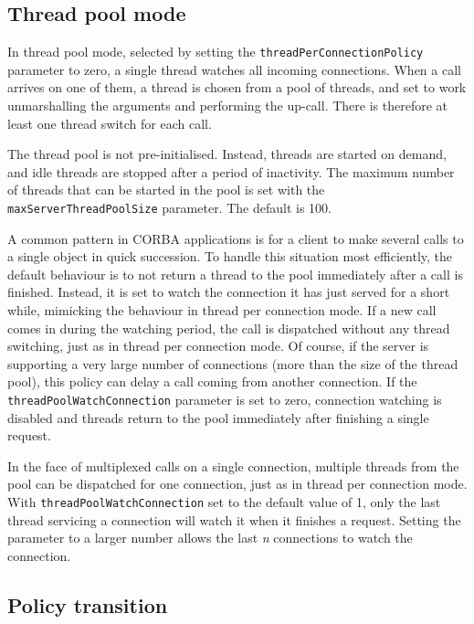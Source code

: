 \documentclass[11pt,oneside,a4paper]{book}
\newcommand{\code}[1]{\texttt{#1}}
\newcommand{\dsc}{\discretionary{}{}{}}
\begin{document}
\subsection{Thread pool mode}
\label{sec:watchConn}

In thread pool mode, selected by setting the
\code{threadPerConnectionPolicy} parameter to zero, a single thread
watches all incoming connections. When a call arrives on one of them,
a thread is chosen from a pool of threads, and set to work
unmarshalling the arguments and performing the up-call. There is
therefore at least one thread switch for each call.

The thread pool is not pre-initialised. Instead, threads are started
on demand, and idle threads are stopped after a period of inactivity.
The maximum number of threads that can be started in the pool is set
with the \code{maxServer\dsc{}ThreadPoolSize} parameter. The default
is 100.

A common pattern in CORBA applications is for a client to make several
calls to a single object in quick succession. To handle this situation
most efficiently, the default behaviour is to not return a thread to
the pool immediately after a call is finished. Instead, it is set to
watch the connection it has just served for a short while, mimicking
the behaviour in thread per connection mode. If a new call comes in
during the watching period, the call is dispatched without any thread
switching, just as in thread per connection mode. Of course, if the
server is supporting a very large number of connections (more than the
size of the thread pool), this policy can delay a call coming from
another connection. If the \code{threadPoolWatch\dsc{}Connection}
parameter is set to zero, connection watching is disabled and threads
return to the pool immediately after finishing a single request.

In the face of multiplexed calls on a single connection, multiple
threads from the pool can be dispatched for one connection, just as in
thread per connection mode. With \code{threadPoolWatchConnection} set
to the default value of 1, only the last thread servicing a connection
will watch it when it finishes a request. Setting the parameter to a
larger number allows the last \emph{n} connections to watch the
connection.


\subsection{Policy transition}
\end{document}
